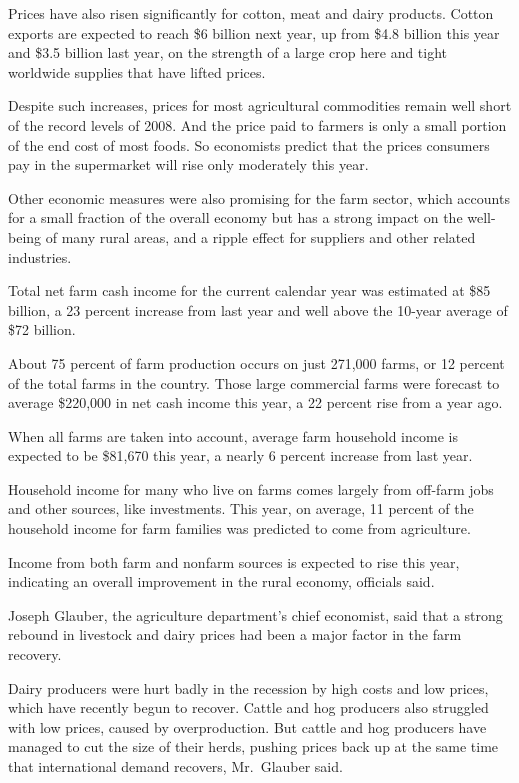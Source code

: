 ﻿\documentclass[12pt]{article}
\begin{document}
Prices have also risen significantly for cotton, meat and dairy products. Cotton exports are
expected to reach \$6 billion next year, up from \$4.8 billion this year and \$3.5 billion last
year, on the strength of a large crop here and tight worldwide supplies that have lifted prices.

Despite such increases, prices for most agricultural commodities remain well short of the record
levels of 2008. And the price paid to farmers is only a small portion of the end cost of most foods.
So economists predict that the prices consumers pay in the supermarket will rise only moderately
this year.

Other economic measures were also promising for the farm sector, which accounts for a small fraction
of the overall economy but has a strong impact on the well-being of many rural areas, and a ripple
effect for suppliers and other related industries.

Total net farm cash income for the current calendar year was estimated at \$85 billion, a 23 percent
increase from last year and well above the 10-year average of \$72 billion.

About 75 percent of farm production occurs on just 271,000 farms, or 12 percent of the total farms
in the country. Those large commercial farms were forecast to average \$220,000 in net cash income
this year, a 22 percent rise from a year ago.

When all farms are taken into account, average farm household income is expected to be \$81,670 this
year, a nearly 6 percent increase from last year.

Household income for many who live on farms comes largely from off-farm jobs and other sources, like
investments. This year, on average, 11 percent of the household income for farm families was
predicted to come from agriculture.

Income from both farm and nonfarm sources is expected to rise this year, indicating an overall
improvement in the rural economy, officials said.

Joseph Glauber, the agriculture department's chief economist, said that a strong rebound in
livestock and dairy prices had been a major factor in the farm recovery.

Dairy producers were hurt badly in the recession by high costs and low prices, which have recently
begun to recover. Cattle and hog producers also struggled with low prices, caused by overproduction.
But cattle and hog producers have managed to cut the size of their herds, pushing prices back up at
the same time that international demand recovers, Mr.~Glauber said.
\end{document}
